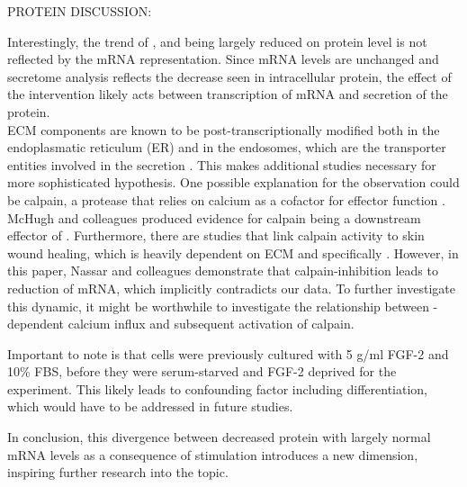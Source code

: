 PROTEIN DISCUSSION:


Interestingly, the trend of \colone{}, \colthree{} and \Fn{} being largely reduced on protein level is not reflected by the mRNA representation. Since mRNA levels are unchanged and secretome analysis reflects the decrease seen in intracellular protein, the effect of the intervention likely acts between transcription of mRNA and secretion of the protein. \\


ECM components are known to be post-transcriptionally modified both in the endoplasmatic reticulum (ER) and in the endosomes, which are the transporter entities involved in the secretion \cite{Ishida2011, Zeltz2014}. This makes additional studies necessary for more sophisticated hypothesis. One possible explanation for the observation could be calpain, a protease that relies on calcium as a cofactor for effector function \cite{Goll2003}. McHugh and colleagues produced evidence for calpain being a downstream effector of \Piezo{} \cite{McHugh2010}. Furthermore, there are studies that link calpain activity to skin wound healing, which is heavily dependent on ECM and specifically \colone{} \cite{Nassar2012}. However, in this paper, Nassar and colleagues demonstrate that calpain-inhibition leads to reduction of \colone{} mRNA, which implicitly contradicts our data. To further investigate this dynamic, it might be worthwhile to investigate the relationship between \Piezo{}-dependent calcium influx and subsequent activation of calpain. \par

Important to note is that cells were previously cultured with 5 \textmu{}g/ml FGF-2 and 10\% FBS, before they were serum-starved and FGF-2 deprived for the experiment. This likely leads to confounding factor including differentiation, which would have to be addressed in future studies.\par

In conclusion, this divergence between decreased protein with largely normal mRNA levels as a consequence of \Piezo{} stimulation introduces a new dimension, inspiring further research into the topic.
